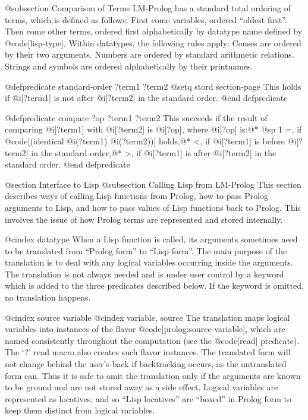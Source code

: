 {@subsection Comparison of Terms
LM-Prolog has a standard total ordering of terms, which is defined as follows:
First come variables, ordered ``oldest first''. Then come other terms,
ordered first alphabetically by datatype name defined by @code[lisp-type].
Within datatypes, the following rules apply:
Conses are ordered by their two arguments.
Numbers are ordered by standard arithmetic relations.
Strings and symbols are ordered alphabetically by their printnames.

@defpredicate standard-order ?term1 ?term2
@setq stord section-page
This holds if @i[?term1] is not after @i[?term2] in the standard order.
@end defpredicate

@defpredicate compare ?op ?term1 ?term2
This succeeds if the result of comparing @i[?term1] with @i[?term2]
is @i[?op], where @i[?op] is:@*
@sp 1
=, if @code[(identical @i(?term1) @i(?term2))] holds,@*
<, if @i[?term1] is before @i[?term2] in the standard order,@*
>, if @i[?term1] is after @i[?term2] in the standard order.
@end defpredicate

@section Interface to Lisp
@subsection Calling Lisp from LM-Prolog
This section describes ways of calling Lisp functions from Prolog, how to
pass Prolog arguments to Lisp, and how to pass values of Lisp functions 
back to Prolog.  This involves the issue of how Prolog terms are represented
and stored internally.

@cindex datatype
When a Lisp function is called, its arguments sometimes need to be translated 
from ``Prolog form'' to ``Lisp form''.  The main purpose of the translation
is to deal with any logical variables occurring inside the arguments.
The translation is not always needed and is under user control by a keyword
which is added to the three predicates described below.  If the keyword is 
omitted, no translation happens.

@cindex source variable
@cindex variable, source
The translation maps logical variables into instances of the flavor
@code[prolog:source-variable], which are named consistently throughout the
computation (see the @code[read] predicate).  The `?' read macro also creates
such flavor instances.  The translated form will not change behind the
user's back if backtracking occurs, as the untranslated form can.
Thus it is safe to omit the translation only if the arguments are known
to be ground and are not stored away as a side effect.
Logical variables are represented as locatives, and so ``Lisp locatives''
are ``boxed'' in Prolog form to keep them distinct from logical variables.

}
